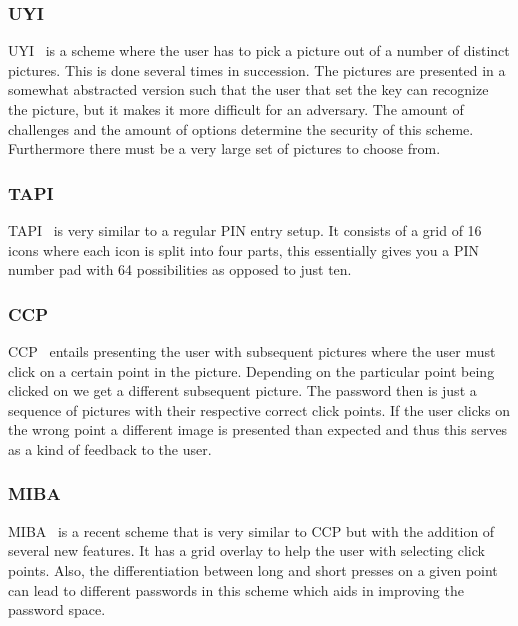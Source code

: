 \documentclass[conference, 11pt]{sty/IEEEtran}
\begin{document}
\subsubsection{UYI}
\label{sssec:uyi}

UYI~\cite{hayashi2008use} is a scheme where the user has to pick a picture out of a number of distinct pictures.
This is done several times in succession.
The pictures are presented in a somewhat abstracted version such that the user that set the key can recognize the picture, but it makes it more difficult for an adversary.
The amount of challenges and the amount of options determine the security of this scheme.
Furthermore there must be a very large set of pictures to choose from.


\subsubsection{TAPI}
\label{sssec:tapi}

TAPI~\cite{citty2010tapi} is very similar to a regular PIN entry setup.
It consists of a grid of 16 icons where each icon is split into four parts, this essentially gives you a PIN number pad with 64 possibilities as opposed to just ten.

\subsubsection{CCP}
\label{sssec:ccp}

CCP~\cite{chiasson2007graphical} entails presenting the user with subsequent pictures where the user must click on a certain point in the picture.
Depending on the particular point being clicked on we get a different subsequent picture.
The password then is just a sequence of pictures with their respective correct click points.
If the user clicks on the wrong point a different image is presented than expected and thus this serves as a kind of feedback to the user.

\subsubsection{MIBA}
\label{sssec:miba}

MIBA~\cite{ritter2013miba} is a recent scheme that is very similar to CCP but with the addition of several new features.
It has a grid overlay to help the user with selecting click points.
Also, the differentiation between long and short presses on a given point can lead to different passwords in this scheme which aids in improving the password space.
\end{document}
